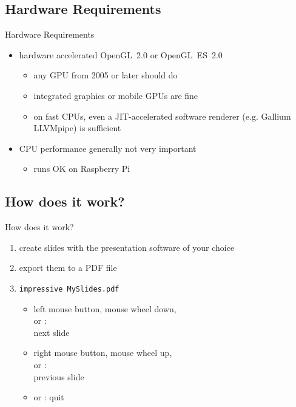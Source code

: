 \documentclass[bigger,hyperref={colorlinks=true,linkcolor=white,urlcolor=blue}]{beamer}
\begin{document}
\subsection{Hardware Requirements}
\begin{frame}{Hardware Requirements}
    \begin{itemize}
        \item hardware accelerated OpenGL~2.0 or OpenGL~ES~2.0
            \begin{itemize}
                \item any GPU from 2005 or later should do
                \item integrated graphics or mobile GPUs are fine
                \item on fast CPUs, even a JIT-accelerated software
                      renderer (e.g. Gallium LLVMpipe) is sufficient
            \end{itemize}
        \item CPU performance generally not very important
            \begin{itemize}
                \item runs OK on Raspberry Pi
            \end{itemize}
    \end{itemize}
\end{frame}

\subsection{How does it work?}
\begin{frame}{How does it work?}
    \begin{enumerate}
        \item create slides with the presentation software of your choice
        \item export them to a PDF file
        \item \texttt{impressive MySlides.pdf}
            \begin{itemize}
                \item left mouse button, mouse wheel down, \\
                      \PgDown or : \\
                      \hspace{1cm} next slide
                \item right mouse button, mouse wheel up, \\
                      \PgUp or : \\
                      \hspace{1cm} previous slide
                \item {} or \Esc: quit
            \end{itemize}
    \end{enumerate}
\end{frame}
\end{document}
